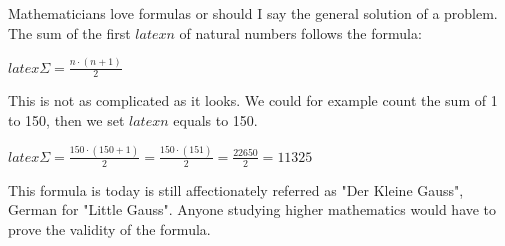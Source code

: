 
\noindent Mathematicians love formulas or should I say the general solution of a problem. The sum of the first $latex n$ of natural numbers follows the formula:

$latex \Sigma = \frac{n\cdot(n+1)}{2}$

\noindent This is not as complicated as it looks. We could for example count the sum of 1 to 150, then we set $latex n$ equals to 150.

$latex \Sigma = \frac{150\cdot(150+1)}{2}= \frac{150\cdot(151)}{2}= \frac{22650}{2}=11325$

\noindent This formula is today is still affectionately referred as "Der Kleine Gauss", German for "Little Gauss". Anyone studying higher mathematics would have to prove the validity of the formula.